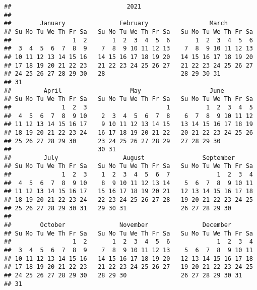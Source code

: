 \documentclass[
]{article}
\begin{document}
\begin{verbatim}
##                                2021                               
## 
##        January               February                 March       
## Su Mo Tu We Th Fr Sa   Su Mo Tu We Th Fr Sa   Su Mo Tu We Th Fr Sa
##                 1  2       1  2  3  4  5  6       1  2  3  4  5  6
##  3  4  5  6  7  8  9    7  8  9 10 11 12 13    7  8  9 10 11 12 13
## 10 11 12 13 14 15 16   14 15 16 17 18 19 20   14 15 16 17 18 19 20
## 17 18 19 20 21 22 23   21 22 23 24 25 26 27   21 22 23 24 25 26 27
## 24 25 26 27 28 29 30   28                     28 29 30 31
## 31
##         April                   May                   June        
## Su Mo Tu We Th Fr Sa   Su Mo Tu We Th Fr Sa   Su Mo Tu We Th Fr Sa
##              1  2  3                      1          1  2  3  4  5
##  4  5  6  7  8  9 10    2  3  4  5  6  7  8    6  7  8  9 10 11 12
## 11 12 13 14 15 16 17    9 10 11 12 13 14 15   13 14 15 16 17 18 19
## 18 19 20 21 22 23 24   16 17 18 19 20 21 22   20 21 22 23 24 25 26
## 25 26 27 28 29 30      23 24 25 26 27 28 29   27 28 29 30
##                        30 31
##         July                  August                September     
## Su Mo Tu We Th Fr Sa   Su Mo Tu We Th Fr Sa   Su Mo Tu We Th Fr Sa
##              1  2  3    1  2  3  4  5  6  7             1  2  3  4
##  4  5  6  7  8  9 10    8  9 10 11 12 13 14    5  6  7  8  9 10 11
## 11 12 13 14 15 16 17   15 16 17 18 19 20 21   12 13 14 15 16 17 18
## 18 19 20 21 22 23 24   22 23 24 25 26 27 28   19 20 21 22 23 24 25
## 25 26 27 28 29 30 31   29 30 31               26 27 28 29 30
## 
##        October               November               December      
## Su Mo Tu We Th Fr Sa   Su Mo Tu We Th Fr Sa   Su Mo Tu We Th Fr Sa
##                 1  2       1  2  3  4  5  6             1  2  3  4
##  3  4  5  6  7  8  9    7  8  9 10 11 12 13    5  6  7  8  9 10 11
## 10 11 12 13 14 15 16   14 15 16 17 18 19 20   12 13 14 15 16 17 18
## 17 18 19 20 21 22 23   21 22 23 24 25 26 27   19 20 21 22 23 24 25
## 24 25 26 27 28 29 30   28 29 30               26 27 28 29 30 31
## 31
\end{verbatim}
\end{document}
